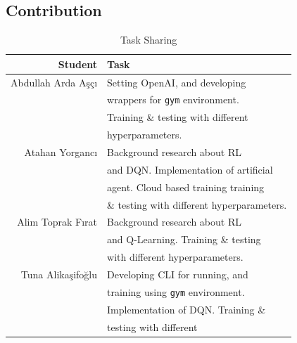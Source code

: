 \begin{appendices}
    \section{Contribution}\label{app:contrib}
    \begin{table}[h]
        \centering
        \caption{Task Sharing}\label{tab:task_sharing}
        \begin{tabular}{rl}\toprule
            \textbf{Student}   & \textbf{Task}                              \\\midrule
            Abdullah Arda Aşçı & Setting OpenAI, and developing             \\
                               & wrappers for \texttt{gym} environment.     \\
                               & Training \& testing with different         \\
                               & hyperparameters.                           \\
            \midrule
            Atahan Yorgancı    & Background research about RL               \\
                               & and DQN\@. Implementation of artificial    \\
                               & agent. Cloud based training training       \\
                               & \& testing with different hyperparameters. \\
            \midrule
            Alim Toprak Fırat  & Background research about RL               \\
                               & and Q-Learning. Training \& testing        \\
                               & with different hyperparameters.            \\
            \midrule
            Tuna Alikaşifoğlu  & Developing CLI for running, and            \\
                               & training using \texttt{gym} environment.   \\
                               & Implementation of DQN\@. Training \&       \\
                               & testing with different                     \\ \bottomrule
        \end{tabular}
    \end{table}


\end{appendices}
